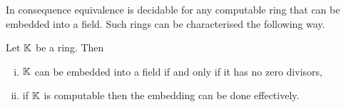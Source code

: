 In consequence equivalence is decidable for any computable ring that can be embedded into a field. %
%
%
Such rings can be characterised the following way.
\begin{lemma}
\label{lem:ring-with-no-zero-divisors-subring-of-a-field}
		Let ${\mathbb K}$ be a ring. Then
		\begin{enumerate}[(i)]
			\item ${\mathbb K}$ can be embedded into a field if and only if it has no zero divisors,
			\item if ${\mathbb K}$ is computable then the embedding can be done effectively.
		\end{enumerate}
\end{lemma}
